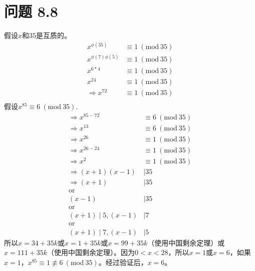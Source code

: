 \documentclass[acmlarge,screen]{acmart}
\begin{document}
\section{问题 8.8}
假设$x$和$35$是互质的。
\begin{align*}
	x^{\phi (35)}&\equiv1\ (\text{mod}\ 35)\\
	x^{\phi (7) \phi (5)}&\equiv1\ (\text{mod}\ 35)\\
	x^{6*4}&\equiv1\ (\text{mod}\ 35)\\
	x^{24}&\equiv1\ (\text{mod}\ 35)\\
	\Rightarrow x^{72}&\equiv1\ (\text{mod}\ 35)\\
\end{align*}
假设$x^{85}\equiv6\ (\text{mod}\ 35)$.
\begin{align*}
	\Rightarrow x^{85-72}&\equiv6\ (\text{mod}\ 35)\\
	\Rightarrow x^{13}&\equiv6\ (\text{mod}\ 35)\\
	\Rightarrow x^{26}&\equiv1\ (\text{mod}\ 35)\\
	\Rightarrow x^{26-24}&\equiv1\ (\text{mod}\ 35)\\
	\Rightarrow x^{2}&\equiv1\ (\text{mod}\ 35)\\
	\Rightarrow (x+1)(x-1) &\mid 35\\
	\Rightarrow (x+1)&\mid35\\
	\text{or}\\
	(x-1)&\mid35\\
	\text{or}\\
	(x+1)\mid5,(x-1)&\mid7\\
	\text{or}\\
	(x+1)\mid7,(x-1)&\mid5
\end{align*}
所以$x=34+35k$或$x=1+35k$或$x=99+35k$（使用中国剩余定理）或$x=111+35k$（使用中国剩余定理）。因为$0<x<28$，所以$x=1$或$x=6$，如果$x=1$，$x^{85}\equiv1\nequiv6\ (\text{mod}\ 35)$。经过验证后，$x=6$。
\end{document}

